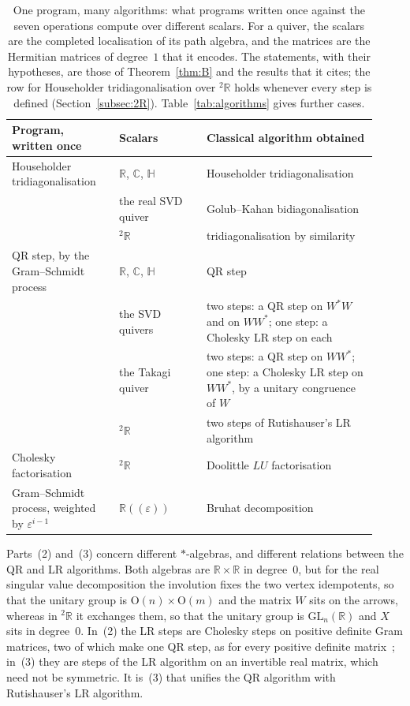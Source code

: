 \documentclass[12pt, a4paper]{report}
\theoremstyle{plain}
\theoremstyle{definition}
\theoremstyle{remark}
\theoremstyle{plain}
\newcommand{\RR}{\mathbb{R}}
\newcommand{\CC}{\mathbb{C}}
\newcommand{\HH}{\mathbb{H}}
\newcommand{\GL}{\mathrm{GL}}
\newcommand{\Or}{\mathrm{O}}
\newcommand{\twoR}{{}^{2}\mathbb{R}}
\newcommand{\rowrule}{\arrayrulecolor{black!30}\midrule[0.3pt]\arrayrulecolor{black}}
\begin{document}
\begin{table}[htbp]
\centering
\caption{One program, many algorithms: what programs written once against the seven operations compute over different scalars. For a quiver, the scalars are the completed localisation of its path algebra, and the matrices are the Hermitian matrices of degree~$1$ that it encodes. The statements, with their hypotheses, are those of Theorem~\ref{thm:B} and the results that it cites; the row for Householder tridiagonalisation over $\twoR$ holds whenever every step is defined (Section~\ref{subsec:2R}). Table~\ref{tab:algorithms} gives further cases.}
\label{tab:one-program}
\small
\renewcommand{\arraystretch}{1.25}
\begin{tabular}{@{}>{\raggedright\arraybackslash}p{0.27\linewidth}>{\raggedright\arraybackslash}p{0.22\linewidth}>{\raggedright\arraybackslash}p{0.43\linewidth}@{}}
\toprule
\textbf{Program, written once} & \textbf{Scalars} & \textbf{Classical algorithm obtained} \\
\midrule
Householder tridiagonalisation & $\RR$, $\CC$, $\HH$ & Householder tridiagonalisation \\ \addlinespace[3pt]
 & the real SVD quiver & Golub--Kahan bidiagonalisation \\ \addlinespace[3pt]
 & $\twoR$ & tridiagonalisation by similarity \\
\rowrule
QR step, by the Gram--Schmidt process & $\RR$, $\CC$, $\HH$ & QR step \\ \addlinespace[3pt]
 & the SVD quivers & two steps: a QR step on $W^*W$ and on $WW^*$; one step: a Cholesky LR step on each \\ \addlinespace[3pt]
 & the Takagi quiver & two steps: a QR step on $WW^*$; one step: a Cholesky LR step on $WW^*$, by a unitary congruence of $W$ \\ \addlinespace[3pt]
 & $\twoR$ & two steps of Rutishauser's LR algorithm \\
\rowrule
Cholesky factorisation & $\twoR$ & Doolittle $LU$ factorisation \\
\rowrule
Gram--Schmidt process, weighted by $\varepsilon^{i-1}$ & $\RR((\varepsilon))$ & Bruhat decomposition \\
\bottomrule
\end{tabular}
\end{table}

Parts~(2) and~(3) concern different $*$-algebras, and different relations between the QR and LR algorithms. Both algebras are $\RR\times\RR$ in degree~$0$, but for the real singular value decomposition the involution fixes the two vertex idempotents, so that the unitary group is $\Or(n)\times\Or(m)$ and the matrix $W$ sits on the arrows, whereas in $\twoR$ it exchanges them, so that the unitary group is $\GL_n(\RR)$ and $X$ sits in degree~$0$. In~(2) the LR steps are Cholesky steps on positive definite Gram matrices, two of which make one QR step, as for every positive definite matrix~\cite{Xu1998}; in~(3) they are steps of the LR algorithm on an invertible real matrix, which need not be symmetric. It is~(3) that unifies the QR algorithm with Rutishauser's LR algorithm.
\end{document}

